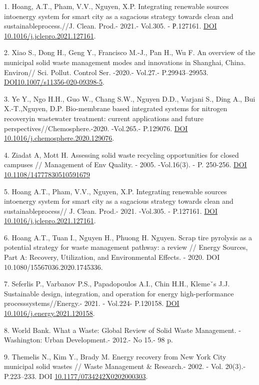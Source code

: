 \begin{references}
1. Hoang, A.T., Pham, V.V., Nguyen, X.P. Integrating renewable sources
intoenergy system for smart city as a sagacious strategy towards clean
and sustainableprocess.//J. Clean. Prod.- 2021.- Vol.305. - Р.127161.
\href{https://doi.org/10.1016/j.jclepro.2021.127161}{DOI
10.1016/j.jclepro.2021.127161}.

2. Xiao S., Dong H., Geng Y., Francisco M.-J., Pan H., Wu F. An overview
of the municipal solid waste management modes and innovations in
Shanghai, China. Environ// Sci. Pollut. Control Ser. -2020.- Vol.27.-
P.29943--29953.
\href{https://doi.org/10.1007/s11356-020-09398-5}{DOI10.1007/s11356-020-09398-5}.

3. Ye Y., Ngo H.H., Guo W., Chang S.W., Nguyen D.D., Varjani S., Ding
A., Bui X.-T.,Nguyen, D.P. Bio-membrane based integrated systems for
nitrogen recoveryin wastewater treatment: current applications and
future perspectives//Chemosphere.-2020. -Vol.265.- P.129076.
\href{https://doi.org/10.1016/j.chemosphere.2020.129076}{DOI
10.1016/j.chemosphere.2020.129076}.

4. Ziadat A, Mott H. Assessing solid waste recycling opportunities for
closed campuses // Management of Env Quality. - 2005. -Vol.16(3). - P.
250-256. \href{https://doi.org/10.1108/14777830510591679}{DOI
10.1108/14777830510591679}

5. Hoang A.T., Pham, V.V., Nguyen, X.P. Integrating renewable sources
intoenergy system for smart city as a sagacious strategy towards clean
and sustainableprocess// J. Clean. Prod.- 2021. -Vol.305. - P.127161.
\href{https://doi.org/\%2010.1016/j.jclepro.2021.127161}{DOI
10.1016/j.jclepro.2021.127161}.

6. Hoang A.T., Tuan I., Nguyen H., Phuong H. Nguyen. Scrap tire
pyrolysis as a potential strategy for waste management pathway: a review
// Energy Sources, Part A: Recovery, Utilization, and Environmental
Effects. - 2020. DOI 10.1080/15567036.2020.1745336.

7. Seferlis P., Varbanov P.S., Papadopoulos A.I., Chin H.H., Klemeˇs
J.J. Sustainable design, integration, and operation for energy
high-performance processsystems//Energy.- 2021. - Vol.224- P.120158.
\href{https://doi.org/10.1016/j.energy.2021.120158}{DOI
10.1016/j.energy.2021.120158}.

8. World Bank. What a Waste: Global Review of Solid Waste Management.
-Washington: Urban Develop\-ment.- 2012.- No 15.- 98 p.

9. Themelis N., Kim Y., Brady M. Energy recovery from New York City
municipal solid wastes // Waste Management \& Research.- 2002. - Vol.
20(3).- P.223--233. DOI
\href{http://dx.doi.org/10.1177/0734242X0202000303}{10.1177/0734242X0202000303}.


\end{references}
